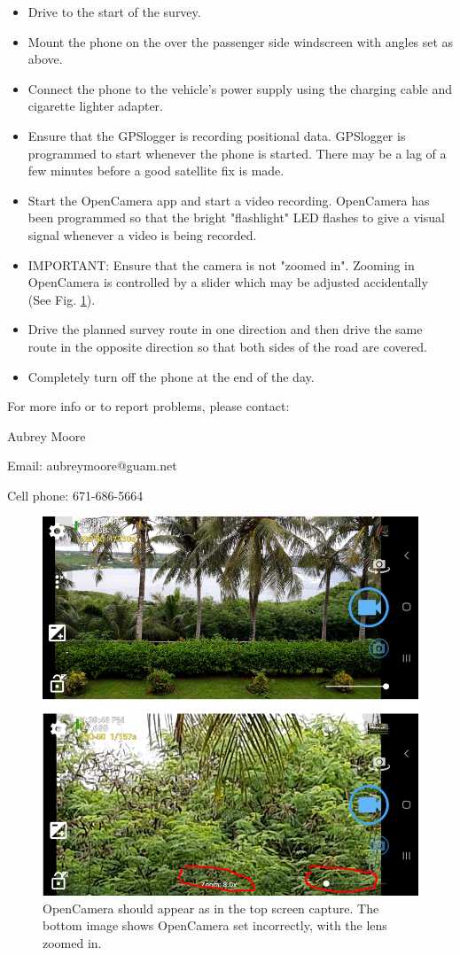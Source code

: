 \documentclass[12pt,letterpaper,english,bibliography=totocnumbered, abstract=on]{scrartcl}
\begin{document}
\begin{itemize}
	\item Drive to the start of the survey.
	\item Mount the phone on the over the passenger side windscreen with angles set as above.
	\item Connect the phone to the vehicle's power supply using the charging cable and cigarette lighter adapter. 
	\item Ensure that the GPSlogger is recording positional data. GPSlogger is programmed to start whenever the phone is started. There may be a lag of a few minutes before a good satellite fix is made.
	\item Start the OpenCamera app and start a video recording. OpenCamera has been programmed so that the bright "flashlight" LED flashes to give a visual signal whenever a video is being recorded.
	\item IMPORTANT: Ensure that the camera is not "zoomed in". Zooming in OpenCamera is controlled by a slider which may be adjusted accidentally (See Fig. \ref{fig:zommedinout}). 
	\item Drive the planned survey route in one direction and then drive the same route in the opposite direction so that both sides of the road are covered.
	\item Completely turn off the phone at the end of the day.  
\end{itemize}

For more info or to report problems, please contact:

Aubrey Moore

Email: aubreymoore@guam.net

Cell phone: 671-686-5664

\begin{figure}
	\centering
	\includegraphics[width=0.7\linewidth]{../images/zommed_in_out}
	\caption{OpenCamera should appear as in the top screen capture. The bottom image
		shows OpenCamera set incorrectly, with the lens zoomed in.}
	\label{fig:zommedinout}
\end{figure}


 
\end{document}
